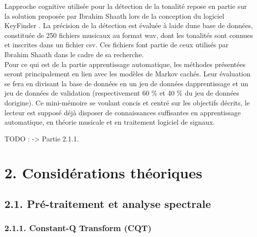 \documentclass[letterpaper]{article}
\begin{document}
L\textquotesingle approche cognitive utilisée pour la détection de la tonalité repose en partie
sur la solution proposée par Ibrahim Sha\textquotesingle ath lors 
de la conception du logiciel KeyFinder \citep{IS}. La précision de la détection est évaluée 
à l\textquotesingle aide d\textquotesingle une base 
de données, constituée de 250 fichiers musicaux au format wav, dont les tonalités sont connues
et inscrites dans un fichier csv. Ces fichiers font partie de ceux utilisés par 
Ibrahim Sha\textquotesingle ath dans le cadre de sa recherche.\\

Pour ce qui est de la partie apprentissage automatique, les méthodes présentées seront principalement
en lien avec les modèles de Markov cachés. Leur évaluation se fera en divisant la base de données en
un jeu de données d\textquotesingle apprentissage et un jeu de données de validation (respectivement
60 \% et 40 \% du jeu de données d\textquotesingle origine). Ce mini-mémoire se voulant concis et 
centré sur les objectifs décrits, le lecteur est supposé déjà disposer de connaissances suffisantes en 
apprentissage automatique, en théorie musicale et en traitement logiciel de signaux.

TODO : \citep{SP} \citep{AT} -> Partie 2.1.1.

\section*{2. Considérations théoriques}

\subsection*{2.1. Pré-traitement et analyse spectrale}

\subsubsection*{2.1.1. Constant-Q Transform (CQT)}
\end{document}
